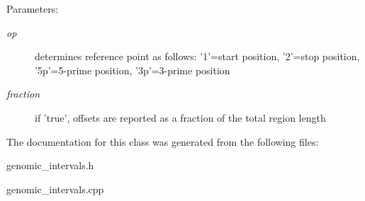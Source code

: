 \begin{Desc}
\item[Parameters:]
\begin{description}
\item[{\em op}]determines reference point as follows: '1'=start position, '2'=stop position, '5p'=5-prime position, '3p'=3-prime position \item[{\em fraction}]if 'true', offsets are reported as a fraction of the total region length \end{description}
\end{Desc}


The documentation for this class was generated from the following files:\begin{CompactItemize}
\item 
genomic\_\-intervals.h\item 
genomic\_\-intervals.cpp\end{CompactItemize}
